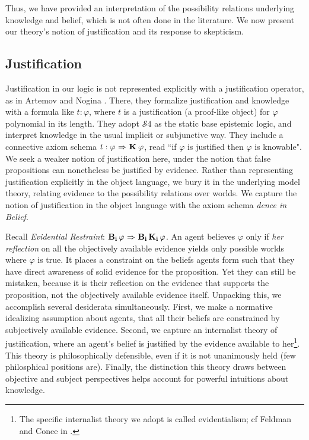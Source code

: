  Thus, we have provided an interpretation of the possibility relations underlying knowledge and belief, which is not often done in the literature. We now present our theory's notion of justification and its response to skepticism.
 
 \subsection{Justification}\label{sec:just}
 Justification in our logic is not represented explicitly with a justification operator, as in Artemov and Nogina \cite{ArtemovNogina}. There, they formalize justification and knowledge with a formula like $t:\varphi$, where $t$ is a justification (a proof-like object) for $\varphi$ polynomial in its length. They adopt $\mathcal{S}4$ as the static base epistemic logic, and interpret knowledge in the usual implicit or subjunctive way. They include a connective axiom schema $t:\varphi {\ \Rightarrow \ } \mathbf{K}_{\mathbf{}}\,\varphi$, read ``if $\varphi$ is justified then $\varphi$ is knowable". We seek a weaker notion of justification here, under the notion that false propositions can nonetheless be justified by evidence. Rather than representing justification explicitly in the object language, we bury it in the underlying model theory, relating evidence to the possibility relations over worlds. We capture the notion of justification in the object language with the axiom schema \emph{dence in Belief}.
 
Recall \emph{Evidential Restraint}: $\mathbf{B}_{\mathbf{i}}\,\varphi {\ \Rightarrow \ } \mathbf{B}_{\mathbf{i}}\,\mathbf{K}_{\mathbf{i}}\,\varphi$. An agent believes $\varphi$ only if \emph{her reflection} on all the objectively available evidence yields only possible worlds where $\varphi$ is true. It places a constraint on the beliefs agents form such that they have direct awareness of solid evidence for the proposition. Yet they can still be mistaken, because it is their reflection on the evidence that supports the proposition, not the objectively available evidence itself. Unpacking this, we accomplish several desiderata simultaneously. First, we make a normative idealizing assumption about agents, that all their beliefs are constrained by subjectively available evidence. Second, we capture an internalist theory of justification, where an agent's belief is justified by the evidence available to her\footnote{The specific internalist theory we adopt is called evidentialism; cf Feldman and Conee in \cite{evidentialism}.}. This theory is philosophically defensible, even if it is not unanimously held (few philosphical positions are). Finally, the distinction this theory draws between objective and subject perspectives helps account for powerful intuitions about knowledge.

